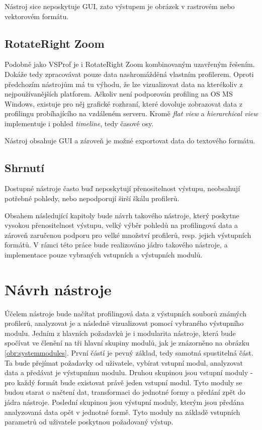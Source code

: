 \documentclass[czech,BP]{thesiskiv}
\begin{document}
Nástroj sice neposkytuje GUI, zato výstupem je obrázek v rastrovém nebo vektorovém formátu.

\section{RotateRight Zoom}

Podobně jako VSProf je i RotateRight Zoom kombinovaným uzavřeným řešením. Dokáže tedy zpracovávat pouze data nashromážděná vlastním profilerem. Oproti předchozím nástrojům má tu výhodu, že lze vizualizovat data na kterékoliv z nejpoužívanějších platforem. Ačkoliv není podporován profiling na OS MS Windows, existuje pro něj grafické rozhraní, které dovoluje zobrazovat data z profilingu probíhajícího na vzdáleném serveru. Kromě \emph{flat view} a \emph{hierarchical view} implementuje i pohled \emph{timeline}, tedy časové osy.

Nástroj obsahuje GUI a zároveň je možné exportovat data do textového formátu.

\section{Shrnutí}

Dostupné nástroje často buď neposkytují přenositelnost výstupu, neobsahují potřebné pohledy, nebo nepodporují širší škálu profilerů.

Obsahem následující kapitoly bude návrh takového nástroje, který poskytne vysokou přenositelnost výstupu, velký výběr pohledů na profilingová data a zároveň zaručenou podporu pro velké množství profilerů, resp. jejich výstupních formátů. V rámci této práce bude realizováno jádro takového nástroje, a implementace pouze vybraných vstupních a výstupních modulů.



\newpage

\chapter{Návrh nástroje}

Účelem nástroje bude načítat profilingová data z výstupních souborů známých profilerů, analyzovat je a následně vizualizovat pomocí vybraného výstupního modulu. Jedním z hlavních požadavků je i modularita nástroje, která bude spočívat ve členění na tři hlavní skupiny modulů, jak je znázorněno na obrázku \ref{obr:systemmodules}. První částí je pevný základ, tedy samotná spustitelná část. Ta bude přejímat požadavky od uživatele, vybírat vstupní modul, analyzovat data a předávat je výstupnímu modulu. Druhou skupinou jsou vstupní moduly - pro každý formát bude existovat právě jeden vstupní modul. Tyto moduly se budou starat o načtení dat, transformaci do jednotné formy a předání zpět do jádra nástroje. Poslední skupinou jsou výstupní moduly, kterým jsou předána analyzovaná data opět v jednotné formě. Tyto moduly na základě vstupních parametrů od uživatele poskytnou požadovaný výstup.
\end{document}
